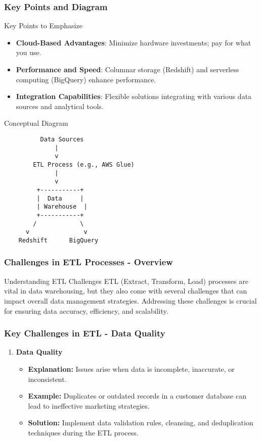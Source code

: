 \documentclass{beamer}
\begin{document}
\begin{frame}[fragile]
    \frametitle{Key Points and Diagram}
    \begin{block}{Key Points to Emphasize}
        \begin{itemize}
            \item \textbf{Cloud-Based Advantages}: Minimize hardware investments; pay for what you use.
            \item \textbf{Performance and Speed}: Columnar storage (Redshift) and serverless computing (BigQuery) enhance performance.
            \item \textbf{Integration Capabilities}: Flexible solutions integrating with various data sources and analytical tools.
        \end{itemize}
    \end{block}
    
    \begin{block}{Conceptual Diagram}
        \begin{verbatim}
          Data Sources
              |
              v
        ETL Process (e.g., AWS Glue)
              |
              v
         +-----------+
         |  Data     |
         | Warehouse  |
         +-----------+
        /            \
      v               v
    Redshift      BigQuery
        \end{verbatim}
    \end{block}
\end{frame}

\begin{frame}[fragile]
    \frametitle{Challenges in ETL Processes - Overview}
    \begin{block}{Understanding ETL Challenges}
        ETL (Extract, Transform, Load) processes are vital in data warehousing, but they also come with several challenges that can impact overall data management strategies. Addressing these challenges is crucial for ensuring data accuracy, efficiency, and scalability.
    \end{block}
\end{frame}

\begin{frame}[fragile]
    \frametitle{Key Challenges in ETL - Data Quality}
    \begin{enumerate}
        \item \textbf{Data Quality}
        \begin{itemize}
            \item \textbf{Explanation:} Issues arise when data is incomplete, inaccurate, or inconsistent.
            \item \textbf{Example:} Duplicates or outdated records in a customer database can lead to ineffective marketing strategies.
            \item \textbf{Solution:} Implement data validation rules, cleansing, and deduplication techniques during the ETL process.
        \end{itemize}
    \end{enumerate}
\end{frame}
\end{document}
